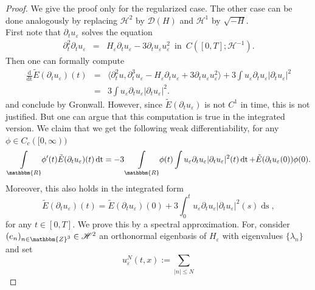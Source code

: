\documentclass[11pt, oneside]{article}   	%
\newcommand{\assign}{:=}
\newcommand{\mathd}{\mathrm{d}}
\newcommand{\tmop}[1]{\ensuremath{\operatorname{#1}}}
\newcommand{\ssp}{\mathscr{H}}
\begin{document}
\begin{proof}
	We give the proof only for the regularized case. The other case can be done analogously by replacing $\ssp^2$ by $\mathscr{D}(H)$ and  $\ssp^1$ by ${\sqrt{-H}}$. \\
	First note that $\partial_t u_{\varepsilon}$ solves the equation
	\[ \begin{array}{lll}
	\partial^2_t \partial_t u_{\varepsilon} & = & H_{\varepsilon}
	\partial_t u_{\varepsilon} - 3 \partial_t u_{\varepsilon}
	u_{\varepsilon}^2 \ \tmop{in} \  C([0,T];\ssp^{- 1}).
	\end{array} \]
	Then one can formally compute
	\begin{eqnarray*}
		\frac{\mathd}{\tmop{dt}} \tilde{E} (\partial_t u_{\varepsilon}) (t) & = &
		\langle \partial^2_t u, \partial^3_t u_{\varepsilon} - H_{\varepsilon}
		\partial_t u_{\varepsilon} + 3 \partial_t u_{\varepsilon}
		u_{\varepsilon}^2  \rangle + 3 \int u_{\varepsilon} \partial_t
		u_{\varepsilon} | \partial_t u_{\varepsilon} |^2\\
		& = & 3 \int u_{\varepsilon} \partial_t u_{\varepsilon} | \partial_t
		u_{\varepsilon} |^2 .
	\end{eqnarray*}
	and conclude by Gronwall. However, since $\tilde{E} (\partial_t u_{\varepsilon})$ is not $C^1$ in time, this is
	not justified.  But one can argue that this
	computation is true in the integrated version. 
	We claim that we get the following weak differentiability, for any $\phi \in C_{c} ([0,
	\infty))$
	\begin{equation}
	\underset{\mathbbm{R}}{\int} \phi' (t) \tilde{E} (\partial_t
	u_{\varepsilon}) (t) \tmop{dt} = - 3 \underset{\mathbbm{R}}{\int} \phi (t)
	\int u_{\varepsilon} \partial_t u_{\varepsilon} | \partial_t
	u_{\varepsilon} |^2 (t) \tmop{dt} +\tilde{E}(\partial_tu_\varepsilon(0))\phi(0). \label{eqn:3ddtenergy}
	\end{equation}
	Moreover, this also holds in the integrated form
	\begin{equation}
	\tilde{E} (\partial_t u_{\varepsilon}) (t) = \tilde{E} (\partial_t
	u_{\varepsilon}) (0) + 3  \int_{0}^{t}
	u_{\varepsilon} \partial_t u_{\varepsilon} | \partial_t u_{\varepsilon}
	|^2 (s) \tmop{ds},  \label{eqn:3ddtenint}
	\end{equation}
	for any $t\in[0,T].$
	We prove this by a spectral approximation. For, consider $(e_n)_{n \in
		\mathbbm{Z}^3} \in \ssp^2$ an orthonormal eigenbasis of $H_{\varepsilon}$ with
	eigenvalues $\{ \lambda_n\} $ and set
	\[ u^N_{\varepsilon} (t, x) \assign \underset{| n | \le N}{\sum}
\]
\end{proof}
\end{document}

